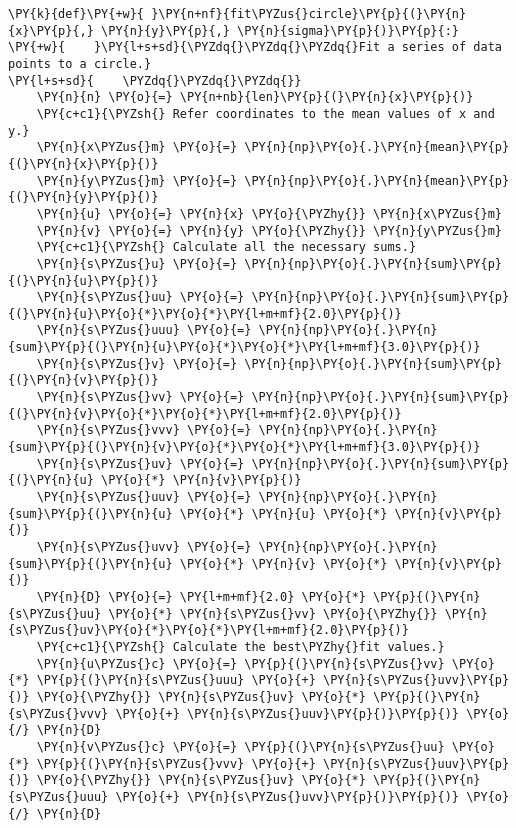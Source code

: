 \begin{Verbatim}[label=\makebox{\href{https://github.com/unipi-physics-labs/statnotes/tree/main/snippy/fit_circle.py}{https://github.com/.../fit\_circle.py}},commandchars=\\\{\}]
\PY{k}{def}\PY{+w}{ }\PY{n+nf}{fit\PYZus{}circle}\PY{p}{(}\PY{n}{x}\PY{p}{,} \PY{n}{y}\PY{p}{,} \PY{n}{sigma}\PY{p}{)}\PY{p}{:}
\PY{+w}{    }\PY{l+s+sd}{\PYZdq{}\PYZdq{}\PYZdq{}Fit a series of data points to a circle.}
\PY{l+s+sd}{    \PYZdq{}\PYZdq{}\PYZdq{}}
    \PY{n}{n} \PY{o}{=} \PY{n+nb}{len}\PY{p}{(}\PY{n}{x}\PY{p}{)}
    \PY{c+c1}{\PYZsh{} Refer coordinates to the mean values of x and y.}
    \PY{n}{x\PYZus{}m} \PY{o}{=} \PY{n}{np}\PY{o}{.}\PY{n}{mean}\PY{p}{(}\PY{n}{x}\PY{p}{)}
    \PY{n}{y\PYZus{}m} \PY{o}{=} \PY{n}{np}\PY{o}{.}\PY{n}{mean}\PY{p}{(}\PY{n}{y}\PY{p}{)}
    \PY{n}{u} \PY{o}{=} \PY{n}{x} \PY{o}{\PYZhy{}} \PY{n}{x\PYZus{}m}
    \PY{n}{v} \PY{o}{=} \PY{n}{y} \PY{o}{\PYZhy{}} \PY{n}{y\PYZus{}m}
    \PY{c+c1}{\PYZsh{} Calculate all the necessary sums.}
    \PY{n}{s\PYZus{}u} \PY{o}{=} \PY{n}{np}\PY{o}{.}\PY{n}{sum}\PY{p}{(}\PY{n}{u}\PY{p}{)}
    \PY{n}{s\PYZus{}uu} \PY{o}{=} \PY{n}{np}\PY{o}{.}\PY{n}{sum}\PY{p}{(}\PY{n}{u}\PY{o}{*}\PY{o}{*}\PY{l+m+mf}{2.0}\PY{p}{)}
    \PY{n}{s\PYZus{}uuu} \PY{o}{=} \PY{n}{np}\PY{o}{.}\PY{n}{sum}\PY{p}{(}\PY{n}{u}\PY{o}{*}\PY{o}{*}\PY{l+m+mf}{3.0}\PY{p}{)}
    \PY{n}{s\PYZus{}v} \PY{o}{=} \PY{n}{np}\PY{o}{.}\PY{n}{sum}\PY{p}{(}\PY{n}{v}\PY{p}{)}
    \PY{n}{s\PYZus{}vv} \PY{o}{=} \PY{n}{np}\PY{o}{.}\PY{n}{sum}\PY{p}{(}\PY{n}{v}\PY{o}{*}\PY{o}{*}\PY{l+m+mf}{2.0}\PY{p}{)}
    \PY{n}{s\PYZus{}vvv} \PY{o}{=} \PY{n}{np}\PY{o}{.}\PY{n}{sum}\PY{p}{(}\PY{n}{v}\PY{o}{*}\PY{o}{*}\PY{l+m+mf}{3.0}\PY{p}{)}
    \PY{n}{s\PYZus{}uv} \PY{o}{=} \PY{n}{np}\PY{o}{.}\PY{n}{sum}\PY{p}{(}\PY{n}{u} \PY{o}{*} \PY{n}{v}\PY{p}{)}
    \PY{n}{s\PYZus{}uuv} \PY{o}{=} \PY{n}{np}\PY{o}{.}\PY{n}{sum}\PY{p}{(}\PY{n}{u} \PY{o}{*} \PY{n}{u} \PY{o}{*} \PY{n}{v}\PY{p}{)}
    \PY{n}{s\PYZus{}uvv} \PY{o}{=} \PY{n}{np}\PY{o}{.}\PY{n}{sum}\PY{p}{(}\PY{n}{u} \PY{o}{*} \PY{n}{v} \PY{o}{*} \PY{n}{v}\PY{p}{)}
    \PY{n}{D} \PY{o}{=} \PY{l+m+mf}{2.0} \PY{o}{*} \PY{p}{(}\PY{n}{s\PYZus{}uu} \PY{o}{*} \PY{n}{s\PYZus{}vv} \PY{o}{\PYZhy{}} \PY{n}{s\PYZus{}uv}\PY{o}{*}\PY{o}{*}\PY{l+m+mf}{2.0}\PY{p}{)}
    \PY{c+c1}{\PYZsh{} Calculate the best\PYZhy{}fit values.}
    \PY{n}{u\PYZus{}c} \PY{o}{=} \PY{p}{(}\PY{n}{s\PYZus{}vv} \PY{o}{*} \PY{p}{(}\PY{n}{s\PYZus{}uuu} \PY{o}{+} \PY{n}{s\PYZus{}uvv}\PY{p}{)} \PY{o}{\PYZhy{}} \PY{n}{s\PYZus{}uv} \PY{o}{*} \PY{p}{(}\PY{n}{s\PYZus{}vvv} \PY{o}{+} \PY{n}{s\PYZus{}uuv}\PY{p}{)}\PY{p}{)} \PY{o}{/} \PY{n}{D}
    \PY{n}{v\PYZus{}c} \PY{o}{=} \PY{p}{(}\PY{n}{s\PYZus{}uu} \PY{o}{*} \PY{p}{(}\PY{n}{s\PYZus{}vvv} \PY{o}{+} \PY{n}{s\PYZus{}uuv}\PY{p}{)} \PY{o}{\PYZhy{}} \PY{n}{s\PYZus{}uv} \PY{o}{*} \PY{p}{(}\PY{n}{s\PYZus{}uuu} \PY{o}{+} \PY{n}{s\PYZus{}uvv}\PY{p}{)}\PY{p}{)} \PY{o}{/} \PY{n}{D}

\end{Verbatim}
